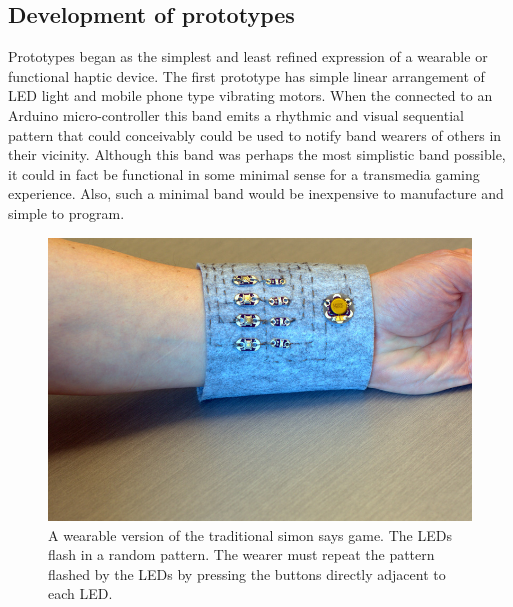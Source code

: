 \documentclass{chi-ext}
\begin{document}
\subsection{ Development of prototypes}
Prototypes began as the simplest and least refined expression of a wearable or functional haptic device. The first prototype has simple linear arrangement of LED light and mobile phone type vibrating motors. When the connected to an Arduino micro-controller this band emits a rhythmic and visual sequential pattern that could conceivably could be used to notify band wearers of others in their vicinity. Although this band was perhaps the most simplistic band possible, it could in fact be functional in some minimal sense for a transmedia gaming experience. Also, such a minimal band would be inexpensive to manufacture and simple to program. 

\begin{figure}
  \begin{center}
  \includegraphics[width=\columnwidth]{images/P1130375.jpg}
  \caption{A wearable version of the traditional simon says game. The LEDs flash in a random pattern. The wearer must repeat the pattern flashed by the LEDs by pressing the buttons directly adjacent to each LED.}
  \label{fig:marginparsample}
  \end{center}  
\end{figure}
\end{document}
